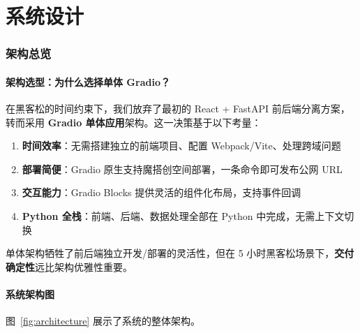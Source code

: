 \documentclass[12pt,a4paper]{article}
\begin{document}
\newpage
\part{系统设计}

\section{架构总览}
\label{sec:architecture}

\subsection{架构选型：为什么选择单体 Gradio？}

在黑客松的时间约束下，我们放弃了最初的 React + FastAPI 前后端分离方案，转而采用 \textbf{Gradio 单体应用}架构。这一决策基于以下考量：

\begin{enumerate}[leftmargin=2em]
    \item \textbf{时间效率}：无需搭建独立的前端项目、配置 Webpack/Vite、处理跨域问题
    \item \textbf{部署简便}：Gradio 原生支持魔搭创空间部署，一条命令即可发布公网 URL
    \item \textbf{交互能力}：Gradio Blocks 提供灵活的组件化布局，支持事件回调
    \item \textbf{Python 全栈}：前端、后端、数据处理全部在 Python 中完成，无需上下文切换
\end{enumerate}

\begin{warnbox}[权衡说明]
单体架构牺牲了前后端独立开发/部署的灵活性，但在 5 小时黑客松场景下，\textbf{交付确定性}远比架构优雅性重要。
\end{warnbox}

\subsection{系统架构图}

图~\ref{fig:architecture} 展示了系统的整体架构。
\end{document}

